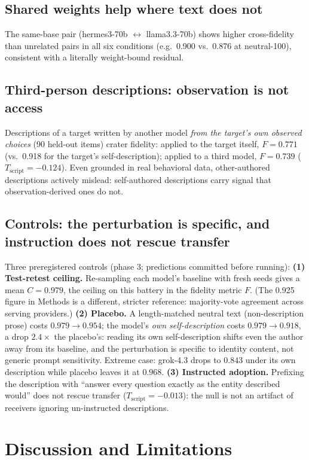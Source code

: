 \documentclass[11pt]{article}
\newcommand{\Tscript}{T_{\mathrm{script}}}
\begin{document}
\subsection{Shared weights help where text does not}
The same-base pair (hermes3-70b $\leftrightarrow$ llama3.3-70b) shows higher
cross-fidelity than unrelated pairs in all six conditions (e.g.\ 0.900 vs.\
0.876 at neutral-100), consistent with a literally weight-bound residual.

\subsection{Third-person descriptions: observation is not access}
Descriptions of a target written by another model \emph{from the target's own
observed choices} (90 held-out items) crater fidelity: applied to the target
itself, $F=0.771$ (vs.\ 0.918 for the target's self-description); applied to a
third model, $F=0.739$ ($\Tscript=-0.124$). Even grounded in real behavioral
data, other-authored descriptions actively mislead: self-authored
descriptions carry signal that observation-derived ones do not.

\subsection{Controls: the perturbation is specific, and instruction does not
rescue transfer}
Three preregistered controls (phase 3; predictions committed before running):
\textbf{(1) Test-retest ceiling.} Re-sampling each model's baseline with fresh
seeds gives a mean $C=0.979$, the ceiling on this battery in the fidelity
metric $F$. (The 0.925 figure in Methods is a different, stricter reference:
majority-vote agreement across serving providers.)
\textbf{(2) Placebo.} A length-matched neutral text (non-description prose)
costs $0.979 \to 0.954$; the model's \emph{own self-description} costs
$0.979 \to 0.918$, a drop $2.4\times$ the placebo's: reading its own
self-description shifts even the author away from its baseline, and the
perturbation is specific to identity content, not generic prompt sensitivity. Extreme case:
grok-4.3 drops to $0.843$ under its own description while placebo leaves it at
$0.968$. \textbf{(3) Instructed adoption.} Prefixing the description with
``answer every question exactly as the entity described would'' does not
rescue transfer ($\Tscript=-0.013$): the null is not an artifact of receivers
ignoring un-instructed descriptions.

\section{Discussion and Limitations}
\end{document}
